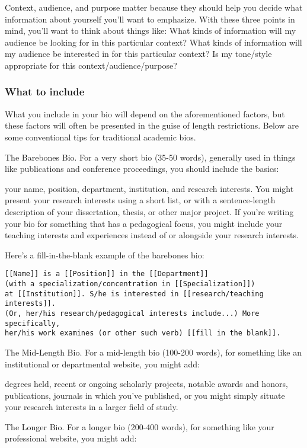 Context, audience, and purpose matter because they should help you decide what information about yourself you'll want to emphasize. With these three points in mind, you'll want to think about things like: What kinds of information will my audience be looking for in this particular context? What kinds of information will my audience be interested in for this particular context? Is my tone/style appropriate for this context/audience/purpose?

\subsubsection{What to include}
What you include in your bio will depend on the aforementioned factors, but these factors will often be presented in the guise of length restrictions. Below are some conventional tips for traditional academic bios.

The Barebones Bio. For a very short bio (35-50 words), generally used in things like publications and conference proceedings, you should include the basics:

your name,
position,
department,
institution, and
research interests.
You might present your research interests using a short list, or with a sentence-length description of your dissertation, thesis, or other major project. If you're writing your bio for something that has a pedagogical focus, you might include your teaching interests and experiences instead of or alongside your research interests.

Here's a fill-in-the-blank example of the barebones bio:

\begin{verbatim}
[[Name]] is a [[Position]] in the [[Department]] 
(with a specialization/concentration in [[Specialization]]) 
at [[Institution]]. S/he is interested in [[research/teaching interests]]. 
(Or, her/his research/pedagogical interests include...) More specifically, 
her/his work examines (or other such verb) [[fill in the blank]].
\end{verbatim}

The Mid-Length Bio. For a mid-length bio (100-200 words), for something like an institutional or departmental website, you might add:

degrees held,
recent or ongoing scholarly projects,
notable awards and honors,
publications,
journals in which you've published, or
you might simply situate your research interests in a larger field of study.

The Longer Bio. For a longer bio (200-400 words), for something like your professional website, you might add:

